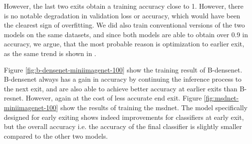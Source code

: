 However, the last two exits obtain a training accuracy close to 1. However, there is no notable degradation in validation loss or accuracy, which would have been the clearest sign of overfitting. We did also train conventional versions of the two models on the same datasets, and since both models are able to obtain over 0.9 in accuracy, we argue, that the most probable reason is optimization to earlier exit, as the same trend is shown in \cite{huang_multi-scale_2017}.

Figure \ref{fig:b-densenet-miniimagenet-100} show the training result of B-\gls{densenet}. B-\gls{densenet} always has a gain in accuracy by continuing the inference process to the next exit, and are also able to achieve better accuracy at earlier exits than B-\gls{resnet}. However, again at the cost of less accurate end exit. Figure \ref{fig:msdnet-miniimagenet-100} show the results of training the \gls{msdnet}. The model specifically designed for early exiting shows indeed improvements for classifiers at early exit, but the overall accuracy i.e. the accuracy of the final classifier is slightly smaller compared to the other two models.

